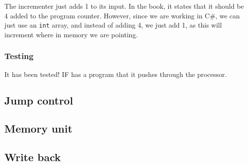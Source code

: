 The incrementer just adds 1 to its input. In the book, it states that it should
be 4 added to the program counter. However, since we are working in C\#, we can
just use an \texttt{int} array, and instead of adding 4, we just add 1, as this
will increment where in memory we are pointing.

\subsubsection*{Testing}
It has been tested! IF has a program that it pushes through the processor.

\subsection{Jump control}
\subsection{Memory unit}
\subsection{Write back}
